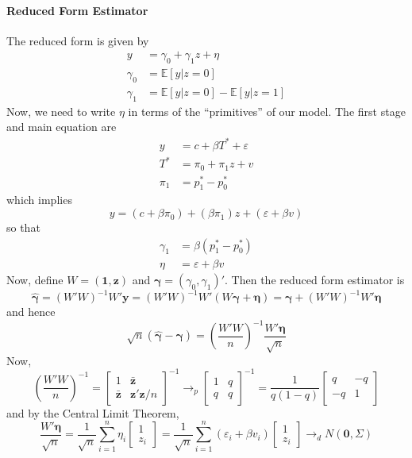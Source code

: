 \documentclass[12pt]{article}
\begin{document}
\paragraph{Reduced Form Estimator}
The reduced form is given by
\begin{align*}
  y &= \gamma_0 + \gamma_1 z + \eta \\
  \gamma_0 &= \mathbb{E}[y|z=0]\\
  \gamma_1 &= \mathbb{E}[y|z=0] - \mathbb{E}[y|z=1]
\end{align*}
Now, we need to write $\eta$ in terms of the ``primitives'' of our model.
The first stage and main equation are
\begin{align*}
  y &= c + \beta T^* + \varepsilon\\
  T^* &= \pi_0 + \pi_1 z + v\\
  \pi_1 &= p_1^* - p_0^*
\end{align*}
which implies
\[
  y = (c + \beta \pi_0) + (\beta \pi_1) z + (\varepsilon + \beta v)
\]
so that
\begin{align*}
\gamma_1 &= \beta(p_1^* - p_0^*)\\
\eta &= \varepsilon + \beta v
\end{align*}
Now, define $W = (\mathbf{1}, \mathbf{z})$ and $\boldsymbol{\gamma} = (\gamma_0, \gamma_1)'$.
Then the reduced form estimator is 
\[
  \widehat{\boldsymbol{\gamma}} = \left(W'W\right)^{-1}  W'\mathbf{y} 
  = \left( W'W \right)^{-1}W'\left( W\boldsymbol{\gamma} + \boldsymbol{\eta} \right) = \boldsymbol{\gamma} + \left( W'W \right)^{-1}W'\boldsymbol{\eta}
\]
and hence
\[
  \sqrt{n}\left( \widehat{\boldsymbol{\gamma}} - \boldsymbol{\gamma}\right) = \left( \frac{W'W}{n} \right)^{-1}\frac{W'\boldsymbol{\eta}}{\sqrt{n}}
\]
Now,
\[
  \left(\frac{W'W}{n}\right)^{-1} = \left[
  \begin{array}{cc}
    1 & \bar{\mathbf{z}} \\
    \bar{\mathbf{z}} & \mathbf{z}'\mathbf{z}/n
  \end{array}
\right]^{-1} \rightarrow_p 
\left[
\begin{array}{cc}
  1 & q \\
  q & q
\end{array}
\right]^{-1}
= \frac{1}{q(1-q)}\left[
\begin{array}{cc}
  q & -q \\
  -q & 1
\end{array}
\right]
\]
and by the Central Limit Theorem,
\[
  \frac{W'\boldsymbol{\eta}}{\sqrt{n}} = \frac{1}{\sqrt{n}}\sum_{i=1}^n \eta_i\left[
  \begin{array}{c}
    1 \\ z_i 
  \end{array}
\right] 
= \frac{1}{\sqrt{n}}\sum_{i=1}^n (\varepsilon_i + \beta v_i)\left[
  \begin{array}{c}
    1 \\ z_i 
  \end{array}
\right] \rightarrow_d N\left(\mathbf{0}, \Sigma \right)
\]
\end{document}
